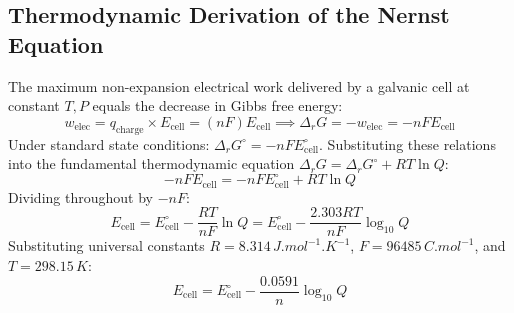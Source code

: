 \documentclass[10pt,twoside,openright]{book}
\begin{document}
\subsection{Thermodynamic Derivation of the Nernst Equation}
The maximum non-expansion electrical work delivered by a galvanic cell at constant $T, P$ equals the decrease in Gibbs free energy:
\begin{equation}
  w_{\text{elec}} = q_{\text{charge}} \times E_{\text{cell}} = (n F) E_{\text{cell}} \implies \Delta_r G = -w_{\text{elec}} = -n F E_{\text{cell}}
\end{equation}
Under standard state conditions: $\Delta_r G^\circ = -n F E_{\text{cell}}^\circ$.
Substituting these relations into the fundamental thermodynamic equation $\Delta_r G = \Delta_r G^\circ + R T \ln Q$:
\begin{equation}
  -n F E_{\text{cell}} = -n F E_{\text{cell}}^\circ + R T \ln Q
\end{equation}
Dividing throughout by $-n F$:
\begin{equation}
  E_{\text{cell}} = E_{\text{cell}}^\circ - \frac{R T}{n F}\ln Q = E_{\text{cell}}^\circ - \frac{2.303 R T}{n F}\log_{10} Q
\end{equation}
Substituting universal constants $R = 8.314\,\si{J.mol^{-1}.K^{-1}}$, $F = 96485\,\si{C.mol^{-1}}$, and $T = 298.15\,\si{K}$:
\begin{equation}
  E_{\text{cell}} = E_{\text{cell}}^\circ - \frac{0.0591}{n}\log_{10} Q
\end{equation}
\end{document}
